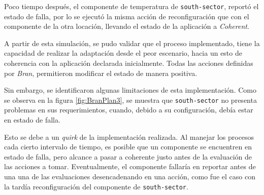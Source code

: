 Poco tiempo después, el componente de temperatura de \texttt{south-sector}, reportó el estado de falla, por lo se ejecutó la misma acción de reconfiguración que con el componente de la otra locación, llevando el estado de la aplicación a \textit{Coherent}.

A partir de esta simulación, se pudo validar que el proceso implementado, tiene la capacidad de realizar la adaptación desde el peor escenario, hacia un esto de coherencia con la aplicación declarada inicialmente. Todas las acciones definidas por \textit{Bran}, permitieron modificar el estado de manera positiva.

Sin embargo, se identificaron algunas limitaciones de esta implementación. Como se observa en la figura \ref{fig:BranPlan3}, se muestra que \texttt{south-sector} no presenta problemas en sus requerimientos, cuando, debido a su configuración, debía estar en estado de falla. 

Esto se debe a un \textit{quirk} de la implementación realizada. Al manejar los procesos cada cierto intervalo de tiempo, es posible que un componente se encuentren en estado de falla, pero alcance a pasar a coherente justo antes de la evaluación de las acciones a tomar. Eventualmente, el componente fallaría en reportar antes de una una de las evaluaciones desencadenando en una acción, como fue el caso con la tardía reconfiguración del componente de \texttt{south-sector}. 